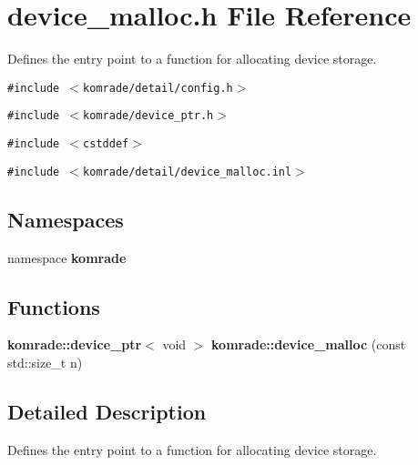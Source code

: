 \section{device\_\-malloc.h File Reference}
\label{device__malloc_8h}
Defines the entry point to a function for allocating device storage. 

{\tt \#include $<$komrade/detail/config.h$>$}\par
{\tt \#include $<$komrade/device\_\-ptr.h$>$}\par
{\tt \#include $<$cstddef$>$}\par
{\tt \#include $<$komrade/detail/device\_\-malloc.inl$>$}\par
\subsection*{Namespaces}
\begin{CompactItemize}
\item 
namespace {\bf komrade}
\end{CompactItemize}
\subsection*{Functions}
\begin{CompactItemize}
\item 
{\bf komrade::device\_\-ptr}$<$ void $>$ {\bf komrade::device\_\-malloc} (const std::size\_\-t n)
\end{CompactItemize}


\subsection{Detailed Description}
Defines the entry point to a function for allocating device storage. 

